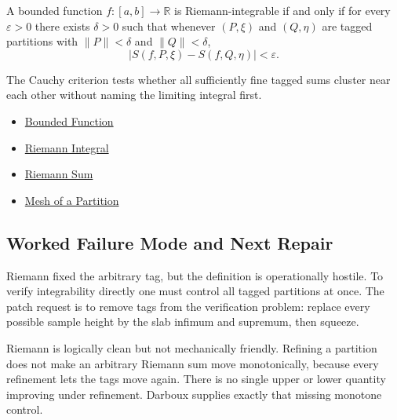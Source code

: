\begin{remark*}
A bounded function \(f:[a,b]\to\mathbb R\) is Riemann-integrable if and only
if for every \(\varepsilon>0\) there exists \(\delta>0\) such that whenever
\((P,\xi)\) and \((Q,\eta)\) are tagged partitions with
\(\|P\|<\delta\) and \(\|Q\|<\delta\),
\[
  |S(f,P,\xi)-S(f,Q,\eta)|<\varepsilon.
\]
\end{remark*}

\begin{remark*}[Interpretation]
The Cauchy criterion tests whether all sufficiently fine tagged sums cluster
near each other without naming the limiting integral first.
\end{remark*}

\begin{dependencies}
\begin{itemize}
  \item \hyperref[def:function-bounded]{Bounded Function}
  \item \hyperref[def:riemann-integral]{Riemann Integral}
  \item \hyperref[def:riemann-sum]{Riemann Sum}
  \item \hyperref[def:partition-mesh]{Mesh of a Partition}
\end{itemize}
\end{dependencies}

\subsection*{Worked Failure Mode and Next Repair}

\begin{remark*}[Interpretation]
Riemann fixed the arbitrary tag, but the definition is operationally hostile.
To verify integrability directly one must control all tagged partitions at
once. The patch request is to remove tags from the verification problem:
replace every possible sample height by the slab infimum and supremum, then
squeeze.
\end{remark*}

\begin{remark*}[Interpretation]
Riemann is logically clean but not mechanically friendly. Refining a partition
does not make an arbitrary Riemann sum move monotonically, because every
refinement lets the tags move again. There is no single upper or lower
quantity improving under refinement. Darboux supplies exactly that missing
monotone control.
\end{remark*}

